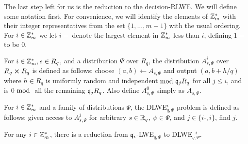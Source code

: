The last step left for us is the reduction to the decision-RLWE. We will define some notation first. For convenience, we will identify the elements of $\Z_m^*$ with their integer representatives from the set $\{1, \ldots, m-1\}$ with the usual ordering. For $i \in \Z_m^*$ we let $i-$ denote the largest element in $\Z_m^*$ less than $i$, defining $1-$ to be 0.
\begin{definition}
	For $i \in \Z_m^*, s \in R_q$, and a distribution $\Psi$ over $R_q$, the
	distribution $A^i_{s,\Psi}$ over $R_q \cross R_q$ is defined as follows: choose $(a, b) \leftarrow A_{s, \Psi}$ and output $(a, b + h/q)$ where $h \in R_q$ is uniformly random and independent$\mod \q_j R_q$ for all $j \leq i$, and is $0 \mod$ all the remaining $\q_j R_q$. Also define $A^0_{s,\Psi}$ simply as $A_{s,\Psi}$.
\end{definition}
\begin{definition}
  For $i \in \Z_m^*$ and a family of distributions $\Psi$, the DLWE$^i_{q,\Psi}$ problem is defined as follows: given access to $A^j_{s,\Psi}$ for arbitrary $s \in \R_q$, $\psi \in \Psi$, and $j \in \{i$-$, i\}$, find $j$.
\end{definition}
\begin{lemma}
  For any $i \in \Z_m^*$, there is a reduction from $\q_i$-LWE$_{q, \Psi}$ to DLWE$^{\text{ }i}_{q, \Psi}$.
\end{lemma}
